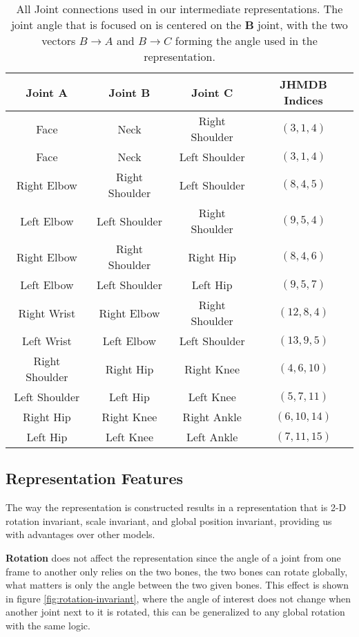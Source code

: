\begin{table}[ht]
	\centering
	\begin{tabular}{||c c c c||} 
		\hline
		\textbf{Joint A} & \textbf{Joint B} & \textbf{Joint C} & \textbf{JHMDB Indices} \\ [0.5ex] 
		\hline\hline
		Face & Neck & Right Shoulder & $(3, 1, 4)$ \\
		Face & Neck & Left Shoulder & $(3, 1, 4)$ \\
		\hline
		Right Elbow & Right Shoulder & Left Shoulder & $(8, 4, 5)$ \\
		Left Elbow & Left Shoulder & Right Shoulder & $(9, 5, 4)$ \\
		\hline
		Right Elbow & Right Shoulder & Right Hip & $(8, 4, 6)$ \\
		Left Elbow & Left Shoulder & Left Hip & $(9, 5, 7)$ \\
		\hline
		Right Wrist & Right Elbow & Right Shoulder & $(12, 8, 4)$ \\
		Left Wrist & Left Elbow & Left Shoulder & $(13, 9, 5)$ \\
		\hline
		Right Shoulder & Right Hip & Right Knee & $(4, 6, 10)$ \\
		Left Shoulder & Left Hip & Left Knee & $(5, 7, 11)$ \\
		\hline
		Right Hip & Right Knee & Right Ankle & $(6, 10, 14)$ \\
		Left Hip & Left Knee & Left Ankle & $(7, 11, 15)$ \\
		\hline
	\end{tabular}
	\caption{All Joint connections used in our intermediate representations. The joint angle that is focused on is centered on the \textbf{B} joint, with the two vectors $B \rightarrow A$ and $B \rightarrow C$ forming the angle used in the representation.}
	\label{tab:joint-connections}
\end{table}

\subsection{Representation Features}

The way the representation is constructed results in a representation that is 2-D rotation invariant, scale invariant, and global position invariant, providing us with advantages over other models.

\textbf{Rotation} does not affect the representation since the angle of a joint from one frame to another only relies on the two bones, the two bones can rotate globally, what matters is only the angle between the two given bones. This effect is shown in figure \ref{fig:rotation-invariant}, where the angle of interest does not change when another joint next to it is rotated, this can be generalized to any global rotation with the same logic.

